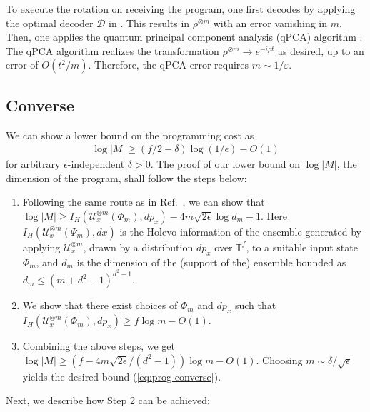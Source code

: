\documentclass[11pt,letterpaper]{article}
\def\eps{\varepsilon}
\def\map{\mathcal}
\begin{document}
To execute the rotation on receiving the program, one first decodes by applying the optimal decoder $\mathcal{D}$ in \cite{yang2018compression}. This results in $\rho^{\otimes m}$ with an error vanishing in $m$. Then, one applies the quantum principal component analysis (qPCA) algorithm  \cite{lloyd2014quantum}. The qPCA algorithm realizes the transformation $\rho^{\otimes m}\to e^{-i\rho t}$ as desired, up to an error of $O(t^2/m)$. Therefore, the qPCA error requires $m\sim1/\eps$.

\subsection{Converse}
We can show a lower bound on the programming cost as
\begin{align}\label{eq:prog-converse}
        \log|M|\ge (f/2-\delta)\log(1/\epsilon)-O(1)
    \end{align} for arbitrary $\epsilon$-independent $\delta>0$. 
The proof of our lower bound on $\log|M|$, the dimension of the program, shall follow the steps below:
\begin{enumerate}
    \item Following the same route as in Ref.~\cite[Supplementary Information]{yang2020optimal}, we can show that $\log |M|\ge I_H(\map{U}_x^{\otimes m}(\Phi_m),d p_x)-4m\sqrt{2\epsilon}\log d_m-1$. Here $I_H(\map{U}_x^{\otimes m}(\Psi_m),d x)$ is the Holevo information of the ensemble generated by applying $\map{U}_x^{\otimes m}$, drawn by a distribution $dp_x$ over $\mathbb{T}^f$, to a suitable input state $\Phi_m$, and $d_m$ is the dimension of the (support of the) ensemble bounded as $d_m\le(m+d^2-1)^{d^2-1}$.
    \item We show that there exist choices of $\Phi_m$ and $dp_x$ such that $I_H(\map{U}_x^{\otimes m}(\Phi_m),dp_x)\ge  f \log m-O(1)$. 
    \item Combining the above steps, we get  $\log |M|\ge (f-4m\sqrt{2\epsilon}/(d^2-1))\log m-O(1)$. Choosing $m\sim \delta/\sqrt{\epsilon}$ yields the desired bound (\ref{eq:prog-converse}).
\end{enumerate}
Next, we describe how Step 2 can be achieved:
\end{document}
